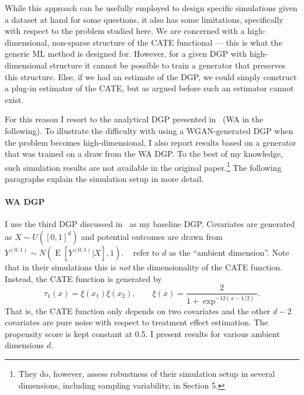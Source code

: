 \documentclass[11pt, a4paper, leqno]{article}
\DeclareMathOperator{\E}{E}
\begin{document}
While this approach can be usefully employed to design specific simulations given a dataset at hand for some questions, it also has some limitations, specifically with respect to the problem studied here.
We are concerned with a high-dimensional, non-sparse structure of the CATE functional --- this is what the generic ML method is designed for.
However, for a given DGP with high-dimensional structure it cannot be possible to train a generator that preserves this structure.
Else, if we had an estimate of the DGP, we could simply construct a plug-in estimator of the CATE, but as argued before such an estimator cannot exist.

For this reason I resort to the analytical DGP presented in~\citet{wager2018estimation} (WA in the following).
To illustrate the difficulty with using a WGAN-generated DGP when the problem becomes high-dimensional, I also report results based on a generator that was trained on a draw from the WA DGP\@.
To the best of my knowledge, such simulation results are not available in the original paper.\footnote{They do, however, assess robustness of their simulation setup in several dimensions, including sampling variability, in Section 5.}
The following paragraphs explain the simulation setup in more detail.

\paragraph*{WA DGP}
I use the third DGP discussed in~\citet{wager2018estimation} as my baseline DGP\@.
Covariates are generated as $X\sim U([0, 1]^d)$ and potential outcomes are drawn from $Y^{(0,1)} \sim N(\E[Y^{(0,1)}|X], 1)$.
~\citet{wager2018estimation} refer to $d$ as the ``ambient dimension''. Note that in their simulations this is \textit{not} the dimensionality of the CATE function.
Instead, the CATE function is generated by
\begin{equation*}
    \tau_1(x) = \xi(x_1)\xi(x_2), \qquad \xi(x) = \frac{2}{1 + \exp^{-12(x-1/2)}}.
\end{equation*}
That is, the CATE function only depends on two covariates and the other $d-2$ covariates are pure noise with respect to treatment effect estimation.
The propensity score is kept constant at 0.5. I present results for various ambient dimensions $d$.
\end{document}
